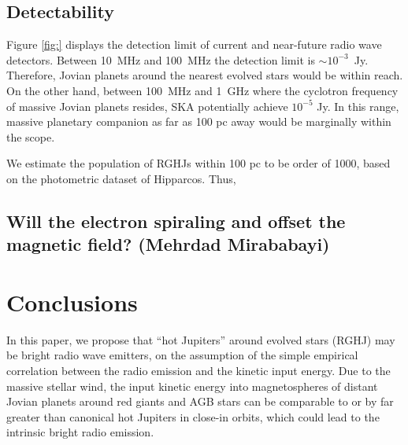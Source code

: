 \documentclass{emulateapj}
\begin{document}
\subsection{Detectability} 
\label{ss:detectability}

Figure \ref{fig:} displays the detection limit of current and near-future radio wave detectors. Between 10~MHz and 100~MHz the detection limit is $\sim 10^{-3}$~Jy. Therefore, Jovian planets around the nearest evolved stars would be within reach. 
On the other hand, between 100~MHz and 1~GHz where the cyclotron frequency of massive Jovian planets resides, SKA potentially achieve $10^{-5}$ Jy. In this range, massive planetary companion as far as 100 pc away would be marginally within the scope. 

We estimate the population of RGHJs within 100 pc to be order of 1000, based on the photometric dataset of Hipparcos. Thus, 


\newpage



\subsection{Will the electron spiraling and offset the magnetic field? (Mehrdad Mirababayi)}
\label{ss:offset}


\citet{gorman2013}





\section{Conclusions}
\label{sec:conc}

In this paper, we propose that ``hot Jupiters'' around evolved stars (RGHJ) may be bright radio wave emitters, on the assumption of the simple empirical correlation between the radio emission and the kinetic input energy. 
Due to the massive stellar wind, the input kinetic energy into magnetospheres of distant Jovian planets around red giants and AGB stars can be comparable to or by far greater than canonical hot Jupiters in close-in orbits, which could lead to the intrinsic bright radio emission. 
\end{document}
